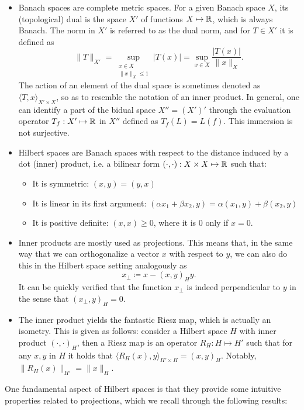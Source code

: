 \begin{itemize}
        \item Banach spaces are complete metric spaces. For a given Banach space $X$, its (topological) dual is the space $X'$ of functions $X\mapsto \mathbb{R}$, which is always Banach. The norm in $X'$ is referred to as the dual norm, and for $T\in X'$ it is defined as 
            $$\|T\|_{X'} = \sup_{\substack{x\in X\\ \|x\|_X\leq 1}} |T(x)|= \sup_{x\in X}\frac{|T(x)|}{\|x\|_X}.$$
        The action of an element of the dual space is sometimes denoted as $\langle T, x\rangle_{X'\times X}$, so as to resemble the notation of an inner product. In general, one can identify a part of the bidual space $X'' = (X')'$ through the evaluation operator $T_f:X'\mapsto \mathbb{R}$ in $X''$ defined as $T_f(L) = L(f)$. This immersion is not surjective. 
        \item Hilbert spaces are Banach spaces with respect to the distance induced by a dot (inner) product, i.e. a bilinear form $(\cdot, \cdot ): X\times X\mapsto \mathbb{R} $ such that: 
            \begin{itemize}
                \item It is symmetric: $( x,y) = ( y, x)$
                \item It is linear in its first argument: $(\alpha x_1 + \beta x_2, y)=\alpha( x_1, y) + \beta( x_2, y)$
                \item It is positive definite: $(x,x)\geq 0$, where it is 0 only if $x=0$.
            \end{itemize}
        \item Inner products are mostly used as projections. This means that, in the same way that we can orthogonalize a vector $x$ with respect to $y$, we can also do this in the Hilbert space setting analogously as 
            $$ x_\perp \coloneqq x - (x, y)_H y. $$
        It can be quickly verified that the function $x_\perp$ is indeed perpendicular to $y$ in the sense that $(x_\perp, y)_H=0$. 
        \item The inner product yields the fantastic Riesz map, which is actually an isometry. This is given as follows: consider a Hilbert space $H$ with inner product $(\cdot, \cdot)_H$, then a Riesz map is an operator $R_H: H\mapsto H'$ such that for any $x,y$ in $H$ it holds that $\langle R_H(x), y\rangle_{H'\times H} = (x, y)_H$. Notably, $\|R_H(x)\|_{H'} = \| x \|_H$. 
    \end{itemize}
One fundamental aspect of Hilbert spaces is that they provide some intuitive properties related to projections, which we recall through the following results: 
